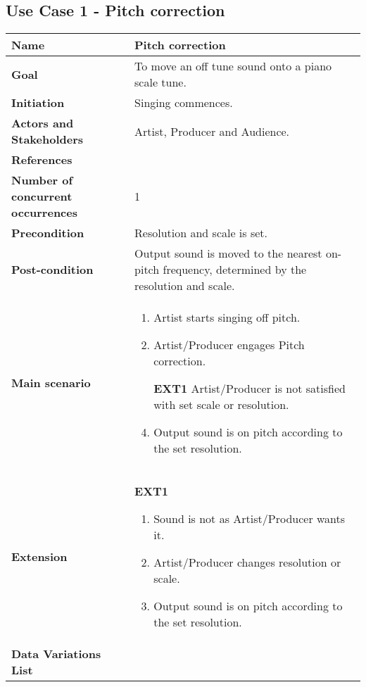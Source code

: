 \subsection{Use Case 1 - Pitch correction}
\begin{table}[H]
	\centering
	\begin{tabularx}{\textwidth}{p{} X}
		\toprule
		\textbf{Name} & Pitch correction \\
		\midrule
		\textbf{Goal} & To move an off tune sound onto a piano scale tune. \\
		\midrule
		\textbf{Initiation} & Singing commences.\\
		\midrule
		\textbf{Actors and Stakeholders} & Artist, Producer and Audience. \\
		\midrule
		\textbf{References} & \\
		\midrule
		\textbf{Number of concurrent occurrences} & 1 \\
		\midrule
		\textbf{Precondition} & Resolution and scale is set. \\
		\midrule
		\textbf{Post-condition} & Output sound is moved to the nearest on-pitch frequency, determined by the resolution and scale. \\
		\midrule
		\textbf{Main scenario} & 
		\begin{enumerate}[noitemsep, topsep=0pt]
			\item Artist starts singing off pitch.
			\item Artist/Producer engages Pitch correction.
			\item[\textbf{EXT1}] Artist/Producer is not satisfied with set scale or resolution.
			\item Output sound is on pitch according to the set resolution.
		\end{enumerate}
		\\
		\midrule
		\textbf{Extension} & 
		\textbf{EXT1}
		\begin{enumerate}[noitemsep, topsep=0pt]
			\item Sound is not as Artist/Producer wants it.
			\item Artist/Producer changes resolution or scale.
			\item Output sound is on pitch according to the set resolution.
		\end{enumerate}
		\\
		\midrule
		\textbf{Data Variations List} & \\
		\bottomrule
	\end{tabularx}
\end{table}
